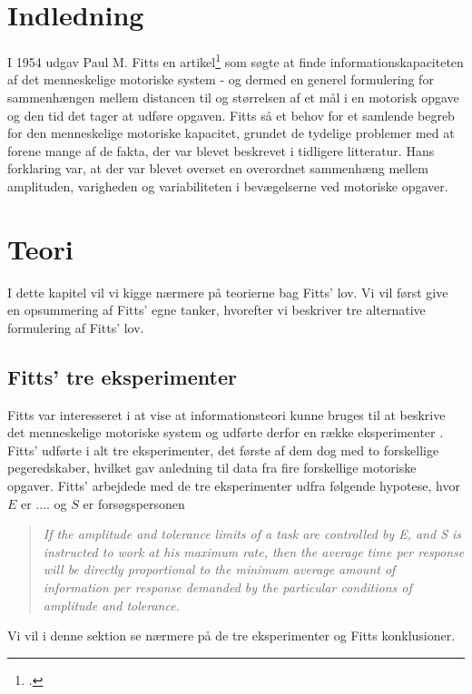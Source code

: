 



\chapter*{Indledning}
I 1954 udgav Paul M. Fitts en artikel\footcite{fitts1954} som søgte at finde informationskapaciteten af det menneskelige motoriske system - og dermed en generel formulering for sammenhængen mellem distancen til og størrelsen af et mål i en motorisk opgave og den tid det tager at udføre opgaven. Fitts så et behov for et samlende begreb for den menneskelige motoriske kapacitet, grundet de tydelige problemer med at forene mange af de fakta, der var blevet beskrevet i tidligere litteratur. Hans forklaring var, at der var blevet overset en overordnet sammenhæng mellem amplituden, varigheden og variabiliteten i bevægelserne ved motoriske opgaver.


\chapter*{Teori}
I dette kapitel vil vi kigge nærmere på teorierne bag Fitts' lov. Vi vil først give en opsummering af Fitts' egne tanker, hvorefter vi beskriver tre alternative formulering af Fitts' lov.

\section*{Fitts' tre eksperimenter}
Fitts var interesseret i at vise at informationsteori kunne bruges til at beskrive det menneskelige motoriske system og udførte derfor en række eksperimenter \cite{fitts1954}. Fitts' udførte i alt tre eksperimenter, det første af dem dog med to forskellige pegeredskaber, hvilket gav anledning til data fra fire forskellige motoriske opgaver. Fitts' arbejdede med de tre eksperimenter udfra følgende hypotese, hvor $E$ er .... og $S$ er forsøgspersonen
\begin{quotation}
\textit{If the amplitude and tolerance limits of a task are controlled by E, and S is instructed to work at his maximum rate, then the average time per response will be directly proportional to the minimum average amount of information per response demanded by the particular conditions of amplitude and tolerance.}
\end{quotation}
Vi vil i denne sektion se nærmere på de tre eksperimenter og Fitts konklusioner.

